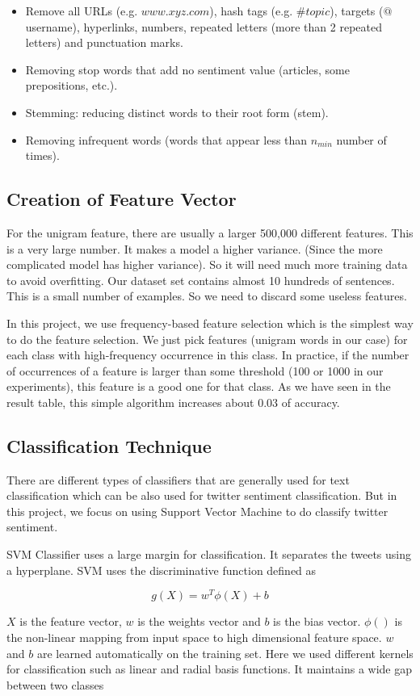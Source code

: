 \begin{itemize}
    \item Remove all URLs (e.g. $www.xyz.com$), hash tags (e.g. $\#topic$), targets ($@$username), hyperlinks, numbers, repeated letters (more than 2 repeated letters) and punctuation marks.
    \item Removing stop words that add no sentiment value (articles, some prepositions, etc.).
    \item Stemming: reducing distinct words to their root form (stem).
    \item Removing infrequent words (words that appear less than $n_{min}$ number of times).
\end{itemize}

\subsection{Creation of Feature Vector}
\label{sec: Creation of Feature Vector}
 
For the unigram feature, there are usually a larger 500,000 different features. This is a very large number. It makes a model a higher variance. (Since the more complicated model has higher variance). So it will need much more training data to avoid overfitting. Our dataset set contains almost 10 hundreds of sentences. This is a small number of examples. So we need to discard some useless features.

In this project, we use frequency-based feature selection which is the simplest way to do the feature selection. We just pick features (unigram words in our case) for each class with high-frequency occurrence in this class. In practice, if the number of occurrences of a feature is larger than some threshold (100 or 1000 in our experiments), this feature is a good one for that class. As we have seen in the result table, this simple algorithm increases about 0.03 of accuracy.


\subsection{Classification Technique}
\label{sec: Classification Technique}

There are different types of classifiers that are generally used for text classification which can be also used for twitter sentiment classification. But in this project, we focus on using  Support Vector Machine to do classify twitter sentiment.

SVM Classifier uses a large margin for classification. It separates the tweets using a hyperplane. SVM uses the discriminative function defined as

\begin{equation} \label{eq: svm}
g(X) = w^T \phi(X) + b
\end{equation}

$X$ is the feature vector, $w$ is the weights vector and $b$ is
the bias vector. $\phi()$ is the non-linear mapping from input space to high dimensional feature space. $w$ and $b$ are learned
automatically on the training set. Here we used different kernels for classification such as linear and radial basis functions. It maintains a wide gap between two classes
